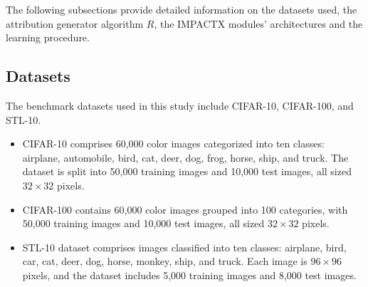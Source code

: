 The following subsections provide detailed information on the datasets used, the attribution generator algorithm $R$, the IMPACTX modules' architectures and the learning procedure.

\subsection{Datasets}
The benchmark datasets used in this study include CIFAR-10, CIFAR-100, and STL-10.
\begin{itemize}
    \item CIFAR-10 \citep{Krizhevsky09} comprises 60,000 color images categorized into ten classes: airplane, automobile, bird, cat, deer, dog, frog, horse, ship, and truck. The dataset is split into 50,000 training images and 10,000 test images, all sized $32 \times 32$ pixels.
    \item CIFAR-100 \citep{Krizhevsky09} contains 60,000 color images grouped into 100 categories, with 50,000 training images and 10,000 test images, all sized $32 \times 32$ pixels.
    \item STL-10 \citep{coates2011analysis} dataset comprises images classified into ten classes: airplane, bird, car, cat, deer, dog, horse, monkey, ship, and truck. Each image is $96 \times 96$ pixels, and the dataset includes 5,000 training images and 8,000 test images.
\end{itemize}

